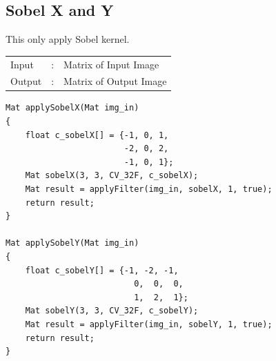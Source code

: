 \documentclass[12pt,a4paper]{report}
\begin{document}
\subsection{Sobel X and Y}
This only apply Sobel kernel.
\begin{tabular}{lll}
    Input  & : & Matrix of Input Image  \\
    Output & : & Matrix of Output Image \\
\end{tabular}
\begin{lstlisting}
Mat applySobelX(Mat img_in)
{
    float c_sobelX[] = {-1, 0, 1,
                        -2, 0, 2,
                        -1, 0, 1};
    Mat sobelX(3, 3, CV_32F, c_sobelX);
    Mat result = applyFilter(img_in, sobelX, 1, true);
    return result;
}

Mat applySobelY(Mat img_in)
{
    float c_sobelY[] = {-1, -2, -1,
                          0,  0,  0,
                          1,  2,  1};
    Mat sobelY(3, 3, CV_32F, c_sobelY);
    Mat result = applyFilter(img_in, sobelY, 1, true);
    return result;
}
\end{lstlisting}
\end{document}
